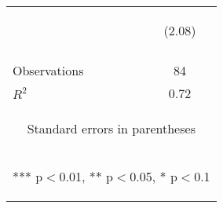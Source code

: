 \begin{center}
\begin{tabular}{lc}
 & \begin{footnotesize}(2.08)\end{footnotesize} \\
\vspace{4pt} & \begin{footnotesize}\end{footnotesize} \\
Observations & 84 \\
 $R^2$ & 0.72 \\ \hline
\multicolumn{2}{c}{\begin{footnotesize} Standard errors in parentheses\end{footnotesize}} \\
\multicolumn{2}{c}{\begin{footnotesize} *** p$<$0.01, ** p$<$0.05, * p$<$0.1\end{footnotesize}} \\
\end{tabular}
\end{center}
